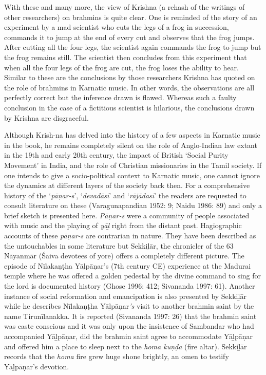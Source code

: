 With these and many more, the view of Krishna (a rehash of the writings of other researchers) on brahmins is quite clear. One is reminded of the story of an experiment by a mad scientist who cuts the legs of a frog in succession, commands it to jump at the end of every cut and observes that the frog jumps. After cutting all the four legs, the scientist again commands the frog to jump but the frog remains still. The scientist then concludes from this experiment that when all the four legs of the frog are cut, the frog loses the ability to hear. Similar to these are the conclusions by those researchers Krishna has quoted on the role of brahmins in Karnatic music. In other words, the observations are all perfectly correct but the inference drawn is flawed. Whereas such a faulty conclusion in the case of a fictitious scientist is hilarious, the conclusions drawn by Krishna are disgraceful.

Although Krish-na has delved into the history of a few aspects in Karnatic music in the book, he remains completely silent on the role of Anglo-Indian law extant in the 19th and early 20th century, the impact of British ‘Social Purity Movement’ in India, and the role of Christian missionaries in the Tamil society. If one intends to give a socio-political context to Karnatic music, one cannot ignore the dynamics at different layers of the society back then. For a comprehensive history of the ‘\textit{pāṇar-s}’, ‘\textit{devadāsī}’ and ‘\textit{rājādasī}’ the readers are requested to consult literature on these (Varagunapandian 1952: 9; Naidu 1986: 89) and only a brief sketch is presented here. \textit{Pāṇar-s} were a community of people associated with music and the playing of \textit{yāḻ} right from the distant past. Hagiographic accounts of these \textit{pāṇar-s} are contrarian in nature. They have been described as the untouchables in some literature but Sekkiḻār, the chronicler of the 63 Nāyanmār (Śaiva devotees of yore) offers a completely different picture. The episode of Nīlakaṇṭha Yāḻpāṇar’s (7th century CE) experience at the Madurai temple where he was offered a golden pedestal by the divine command to sing for the lord is documented history (Ghose 1996: 412; Sivananda 1997: 61). Another instance of social reformation and emancipation is also presented by Sekkiḻār while he describes Nīlakaṇṭha Yāḻpāṇar\textit{’s} visit to another brahmin saint by the name Tirunīlanakka. It is reported (Sivananda 1997: 26) that the brahmin saint was caste conscious and it was only upon the insistence of Sambandar who had accompanied Yāḻpāṇar, did the brahmin saint agree to accommodate Yāḻpāṇar and offered him a place to sleep next to the \textit{homa kuṇḍa} (fire altar). Sekkiḻār records that the \textit{homa} fire grew huge shone brightly, an omen to testify Yāḻpāṇar’s devotion.

